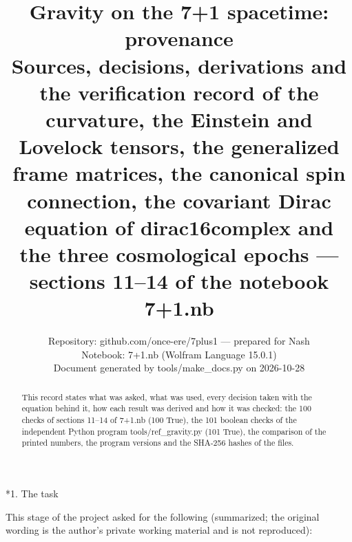 \documentclass[10pt,a4paper]{article}
\makeatletter
\renewcommand\section{\@startsection{section}{1}{\z@}{-3.5ex \@plus -1ex \@minus -.2ex}{2.3ex \@plus.2ex}{\normalfont\Large\bfseries\raggedright}}
\makeatother
\begin{document}
\title{Gravity on the 7+1 spacetime: provenance\\[0.4em]\large Sources, decisions, derivations and the verification record of the curvature, the Einstein and Lovelock tensors, the generalized frame matrices, the canonical spin connection, the covariant Dirac equation of dirac16complex and the three cosmological epochs — sections 11–14 of the notebook 7+1.nb}
\author{Repository: github.com/once-ere/7plus1 — prepared for Nash\\ Notebook: 7+1.nb (Wolfram Language 15.0.1)\\ Document generated by tools/make\_docs.py on 2026-10-28}
\date{}
\maketitle
\begin{abstract}
This record states what was asked, what was used, every decision taken with the equation behind it, how each result was derived and how it was checked: the 100 checks of sections 11–14 of 7+1.nb (100 True), the 101 boolean checks of the independent Python program tools/ref\_gravity.py (101 True), the comparison of the printed numbers, the program versions and the SHA-256 hashes of the files.
\end{abstract}
\tableofcontents
{}\section*{1. The task}
This stage of the project asked for the following (summarized; the original wording is the author’s private working material and is not reproduced):
\end{document}
